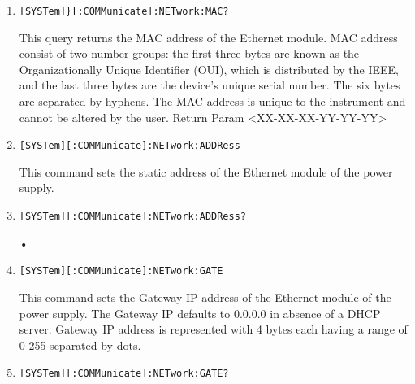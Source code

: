 \documentclass[a4paper,10pt]{article}
\begin{document}
\begin{enumerate}
\begin{enumerate}
            \begin{verbatim}SYSTem:CAPability?\end{verbatim}
            \begin{description}
                Some desc.
            \end{description}
        \item 
            \begin{verbatim}[SYSTem]}[:COMMunicate]:NETwork:MAC?\end{verbatim}
            \begin{description}
                This query returns the MAC address of the Ethernet module. MAC address consist of two number groups: the first three bytes are known as the Organizationally Unique Identifier (OUI), which is distributed by the IEEE, and the last three bytes are the device’s unique serial number. The six bytes are separated by hyphens. The MAC address is unique to the instrument and cannot be altered by the user.
                \newline
                Return Param <XX-XX-XX-YY-YY-YY>
		    \end{description}
		\item 
		    \begin{verbatim}[SYSTem][:COMMunicate]:NETwork:ADDRess\end{verbatim}
		    \begin{description}
		        This command sets the static address of the Ethernet module of the power supply.
		    \end{description}
		\item 
		    \begin{verbatim}[SYSTem][:COMMunicate]:NETwork:ADDRess?\end{verbatim}
		    \begin{description}
		        •
		    \end{description}
		\item 
		    \begin{verbatim}[SYSTem][:COMMunicate]:NETwork:GATE\end{verbatim}
		    \begin{description}
		        This command sets the Gateway IP address of the Ethernet module of the power supply. The Gateway IP defaults to 0.0.0.0 in absence of a DHCP server. Gateway IP address is represented with 4 bytes each having a range of 0-255 separated by dots.
		    \end{description}
		\item 
		    \begin{verbatim}[SYSTem][:COMMunicate]:NETwork:GATE?\end{verbatim}

\end{enumerate}
\end{enumerate}
\end{document}
